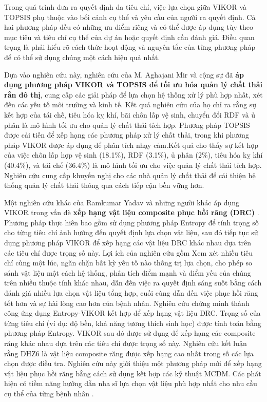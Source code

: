 Trong quá trình đưa ra quyết định đa tiêu chí, việc lựa chọn giữa VIKOR và TOPSIS phụ thuộc vào bối cảnh cụ thể và yêu cầu của người ra quyết định. Cả hai phương pháp đều có những ưu điểm riêng và có thể được áp dụng tùy theo mục tiêu và tiêu chí cụ thể của dự án hoặc quyết định cần đánh giá. Điều quan trọng là phải hiểu rõ cách thức hoạt động và nguyên tắc của từng phương pháp để có thể sử dụng chúng một cách hiệu quả nhất.

Dựa vào nghiên cứu này, nghiên cứu của M. Aghajani Mir và cộng sự đã \textbf{áp dụng phương pháp VIKOR và TOPSIS để tối ưu hóa quản lý chất thải rắn đô thị}, cung cấp các giải pháp để lựa chọn hệ thống xử lý phù hợp nhất, xét đến các yếu tố môi trường và kinh tế. Kết quả nghiên cứu của họ chỉ ra rằng sự kết hợp của tái chế, tiêu hóa kỵ khí, bãi chôn lấp vệ sinh, chuyển đổi RDF và ủ phân là mô hình tối ưu cho quản lý chất thải tích hợp. Phương pháp TOPSIS được cải tiến để xếp hạng các phương pháp xử lý chất thải, trong khi phương pháp VIKOR được áp dụng để phân tích nhạy cảm.Kết quả cho thấy sự kết hợp của việc chôn lấp hợp vệ sinh (18.1\%), RDF (3.1\%), ủ phân (2\%), tiêu hóa kỵ khí (40.4\%), và tái chế (36.4\%) là mô hình tối ưu cho việc quản lý chất thải tích hợp. Nghiên cứu cung cấp khuyến nghị cho các nhà quản lý chất thải để cải thiện hệ thống quản lý chất thải thông qua cách tiếp cận bền vững hơn.

Một nghiên cứu khác của Ramkumar Yadav và những người khác áp dụng VIKOR trong vấn đè \textbf{xếp hạng vật liệu composite phục hồi răng (DRC)} \cite{sciencedirect1}. Phương pháp thực hiên bao gồm sử dụng phương pháp Entropy để tính trọng số cho từng tiêu chí ảnh hưởng đến quyết định lựa chọn vật liệu, sau đó tiếp tục sử dụng phương pháp VIKOR để xếp hạng các vật liệu DRC khác nhau dựa trên các tiêu chí được trọng số này. Lợi ích của nghiên cứu gồm Xem xét nhiều tiêu chí cùng một lúc, ngăn chặn bất kỳ yếu tố nào thống trị lựa chọn, cho phép so sánh vật liệu một cách hệ thống, phân tích điểm mạnh và điểm yếu của chúng trên nhiều thuộc tính khác nhau, dẫn đến việc ra quyết định sáng suốt bằng cách đánh giá nhiều lựa chọn vật liệu tổng hợp, cuối cùng dẫn đến việc phục hồi răng tốt hơn và sự hài lòng cao hơn của bệnh nhân. Nghiên cứu chứng minh thành công ứng dụng Entropy-VIKOR kết hợp để xếp hạng vật liệu DRC. Trọng số của từng tiêu chí (ví dụ: độ bền, khả năng tương thích sinh học) được tính toán bằng phương pháp Entropy. VIKOR sau đó được sử dụng để xếp hạng các composite răng khác nhau dựa trên các tiêu chí được trọng số này. Nghiên cứu kết luận rằng DHZ6 là vật liệu composite răng được xếp hạng cao nhất trong số các lựa chọn được điều tra. Nghiên cứu này giới thiệu một phương pháp mới để xếp hạng vật liệu phục hồi răng bằng cách sử dụng kết hợp các kỹ thuật MCDM. Các phát hiện có tiềm năng hướng dẫn nha sĩ lựa chọn vật liệu phù hợp nhất cho nhu cầu cụ thể của từng bệnh nhân .

